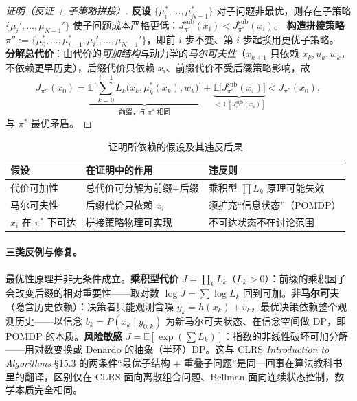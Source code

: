 \begin{proof}[证明（反证 + 子策略拼接）]
\textbf{反设} $\{\mu_i^*,\dots,\mu_{N-1}^*\}$ 对子问题非最优，则存在子策略 $\{\mu_i',\dots,\mu_{N-1}'\}$ 使子问题成本严格更低：$J^{\mathrm{sub}}_{\pi'}(x_i)<J^{\mathrm{sub}}_{\pi^*}(x_i)$。
\textbf{构造拼接策略} $\pi'':=\{\mu_0^*,\dots,\mu_{i-1}^*,\mu_i',\dots,\mu_{N-1}'\}$，即前 $i$ 步不变、第 $i$ 步起换用更优子策略。
\textbf{分解总代价}：由代价的\emph{可加结构}与动力学的\emph{马尔可夫性}（$x_{k+1}$ 只依赖 $x_k,u_k,w_k$，不依赖更早历史），后缀代价只依赖 $x_i$、前缀代价不受后缀策略影响，故
\[
J_{\pi''}(x_0)=\underbrace{\mathbb E\Big[\sum_{k=0}^{i-1}L_k\big(x_k,\mu_k^*(x_k),w_k\big)\Big]}_{\text{前缀，与 }\pi^*\text{ 相同}}+\underbrace{\mathbb E\big[J^{\mathrm{sub}}_{\pi'}(x_i)\big]}_{<\,\mathbb E[J^{\mathrm{sub}}_{\pi^*}(x_i)]}<J_{\pi^*}(x_0),
\]
与 $\pi^*$ 最优矛盾。
\end{proof}

\begin{table}[H]\centering\small
\caption{证明所依赖的假设及其违反后果}
\label{tab:dp-op-assumptions}
\begin{tabular}{lll}
\toprule
假设 & 在证明中的作用 & 违反则 \\
\midrule
代价可加性 & 总代价可分解为前缀$+$后缀 & 乘积型 $\prod L_k$ 原理可能失效 \\
马尔可夫性 & 后缀代价只依赖 $x_i$ & 须扩充“信息状态”（POMDP） \\
$x_i$ 在 $\pi^*$ 下可达 & 拼接策略物理可实现 & 不可达状态不在讨论范围 \\
\bottomrule
\end{tabular}
\end{table}

\paragraph{三类反例与修复。}
最优性原理并非无条件成立。\textbf{乘积型代价} $J=\prod_k L_k$（$L_k>0$）：前缀的乘积因子会改变后缀的相对重要性——取对数 $\log J=\sum\log L_k$ 回到可加。\textbf{非马尔可夫}（隐含历史依赖）：决策者只能观测含噪 $y_k=h(x_k)+v_k$，最优决策依赖整个观测历史——以信念 $b_k=P(x_k\mid y_{0:k})$ 为新马尔可夫状态、在信念空间做 DP，即 POMDP 的本质。\textbf{风险敏感} $J=\mathbb E[\exp(\sum L_k)]$：指数的非线性破坏可加分解——用对数变换或 Denardo 的抽象（半环）DP。这与 CLRS \emph{Introduction to Algorithms} §15.3 的两条件“最优子结构 + 重叠子问题”是同一回事在算法教科书里的翻译，区别仅在 CLRS 面向离散组合问题、Bellman 面向连续状态控制，数学本质完全相同。

